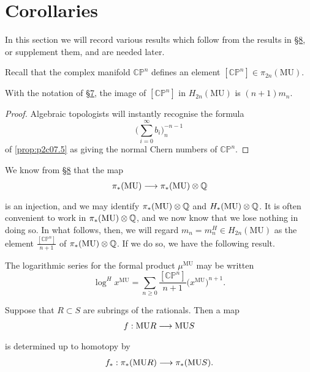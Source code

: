 \documentclass[../main]{subfiles}
\begin{document}
\chapter{Corollaries}
\label{sec:p2c9}
In this section we will record various results which follow from the results in \hyperref[sec:p2c8]{\S 8}, or supplement them, and are needed later.

Recall that the complex manifold $\mathbb {CP}^n$ defines an element $[\mathbb {CP}^n] \in \pi_{2n} (\mathrm {MU})$.

\begin{lemma}
\label{lem:p2c09.1}
With the notation of \hyperref[sec:p2c7]{\S 7}, the image of $[\mathbb {CP}^n]$ in $H_{2n}(\mathrm {MU})$ is $(n + 1)m_n$.
\end{lemma}

\begin{proof}
Algebraic topologists will instantly recognise the formula \[\bigg(\sum_{i = 0}^\infty b_i\bigg)_n^{-n - 1}\] of \eqref{prop:p2c07.5} as giving the normal Chern numbers of $\mathbb {CP}^n$.
\end{proof}
We know from \hyperref[sec:p2c8]{\S 8} that the map \[\pi_\ast(\mathrm{MU}) \lar{} \pi_\ast(\mathrm {MU}) \otimes \bbQ\] is an injection, and we may identify $\pi_\ast(\mathrm{MU}) \otimes \mathbb{Q}$ and $H_\ast(\mathrm{MU}) \otimes \mathbb{Q}$. It is often convenient to work in $\pi_\ast(\mathrm{MU}) \otimes \mathbb{Q}$, and we now know that we lose nothing in doing so. In what follows, then, we will regard $m_n = m_n^H \in H_{2n}(\mathrm{MU})$ as the element $\tfrac {[\mathbb {CP}^n]} {n + 1}$ of $\pi_\ast(\mathrm {MU}) \otimes \mathbb{Q}$. If we do so, we have the following result. 

\begin{corollary}
\label{cor:p2c09.2}
The logarithmic series for the formal product $\mu^{\mathrm{MU}}$ may be written \[\log^{H} x^{\mathrm{MU}} = \sum_{n \ge 0} \frac {[\mathbb {CP}^n]} {n + 1} \big(x^{\mathrm {MU}}\big)^{n + 1}.\]
\end{corollary}

\begin{lemma}
\label{lem:p2c09.3}
Suppose that $R \subset S$ are subrings of the rationals. Then a map \[f : \te{MU}R \lar{} \te{MU}S\] is determined up to homotopy by \[f_\ast : \pi_\ast(\te{MU}R) \lar{} \pi_\ast(\te{MU}S).\]
\end{lemma}
\end{document}
